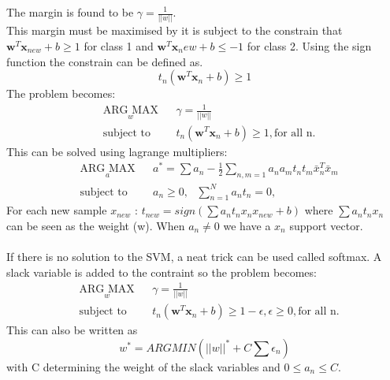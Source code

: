 The margin is found to be $\gamma = \frac{1}{||w||}$.\\
This margin must be maximised by it is subject to the constrain that $\textbf{w}^T\textbf{x}_{new} + b \geq 1$ for class 1 and $\textbf{w}^T\textbf{x}_new + b \leq -1$ for class 2. Using the sign function the constrain can be defined as.
\begin{equation}
t_n(\textbf{w}^T\textbf{x}_{n} + b) \geq 1
\end{equation}
The problem becomes:
\begin{equation*}
\begin{aligned}
& \underset{w}{\text{ARG MAX}}
& & \gamma = \frac{1}{||w||} \\
& \text{subject to}
& & t_n(\textbf{w}^T\textbf{x}_{n} + b) \geq 1, \text{for all n.}
\end{aligned}
\end{equation*}
This can be solved using lagrange multipliers:
\begin{equation}
\begin{aligned}
& \underset{a}{\text{ARG MAX}}
& & a^* =  \sum a_n - \frac{1}{2}\sum_{n,m=1} a_na_mt_nt_m\bar{x}_n^T\bar{x}_m \\
& \text{subject to}
& & a_n \geq 0, \text{  } \sum^N_{n=1}a_nt_n = 0,
\end{aligned}
\end{equation}
For each new sample $x_{new}$ : $t_{new} = sign( \sum a_nt_nx_nx_{new}+b)$ where $\sum a_nt_nx_n$ can be seen as the weight (w). When $a_n \neq 0$ we have a $x_n$ support vector.\\
\ \\
If there is no solution to the SVM, a neat trick can be used called softmax. A slack variable is added to the contraint so the problem becomes:
\begin{equation*}
\begin{aligned}
& \underset{w}{\text{ARG MAX}}
& & \gamma = \frac{1}{||w||} \\
& \text{subject to}
& & t_n(\textbf{w}^T\textbf{x}_{n} + b) \geq 1-\epsilon,\epsilon\geq 0, \text{for all n.}
\end{aligned}
\end{equation*}
This can also be written as
\begin{equation}
w^* = ARG MIN (||w||^* + C \sum \epsilon_n)
\end{equation}
with C determining the weight of the slack variables and $0\leq a_n \leq C$.

